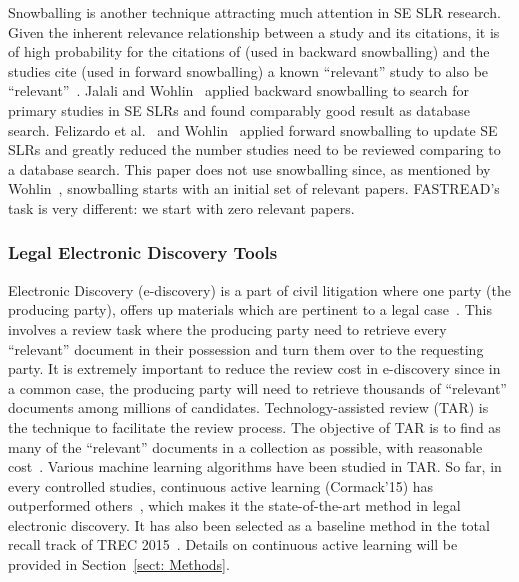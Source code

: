 \documentclass{svjour3}
\theoremstyle{break}
\begin{document}
Snowballing is another technique attracting much attention in SE SLR research. Given the inherent relevance relationship between a study and its citations, it is of high probability for the citations of (used in backward snowballing) and the studies cite (used in forward snowballing) a known ``relevant'' study to also be ``relevant''~\cite{kitchenham2004evidence}. Jalali and Wohlin~\cite{jalali2012systematic,wohlin2014guidelines} applied backward snowballing to search for primary studies in SE SLRs and found comparably good result as database search. Felizardo et al.~\cite{felizardo2016using} and Wohlin~\cite{wohlin2016second} applied forward snowballing to update SE SLRs and greatly reduced the number studies need to be reviewed comparing to a database search. This paper does not use snowballing since, as mentioned by Wohlin~\cite{wohlin2014guidelines}, snowballing starts with an initial set of relevant papers.
FASTREAD's task is very different: we start with zero relevant papers.



\subsubsection{Legal Electronic Discovery Tools}
\label{sect: Electronic Discovery}

Electronic Discovery (e-discovery) is a part of civil litigation where one party (the producing party), offers up materials which are pertinent to a legal case~\cite{krishna2016bigse}. This involves a review task where the producing party need to retrieve every ``relevant'' document in their possession and turn them over to the requesting party. It is extremely important to reduce the review cost in e-discovery since in a common case, the producing party will need to retrieve thousands of ``relevant'' documents among millions of candidates. Technology-assisted review (TAR) is the technique to facilitate the review process. The objective of TAR is to find as many
of the ``relevant'' documents in a collection as possible, with reasonable cost~\cite{grossman2013}. Various machine learning algorithms have been studied in TAR. So far, in every controlled studies, continuous active learning (Cormack'15) has outperformed others~\cite{cormack2014evaluation,cormack2015autonomy}, which makes it the state-of-the-art method in legal electronic discovery. It has also been selected as a baseline method in the total recall track of TREC 2015~\cite{roegiest2015trec}. Details on continuous active learning will be provided in Section~\ref{sect: Methods}. 
\end{document}
